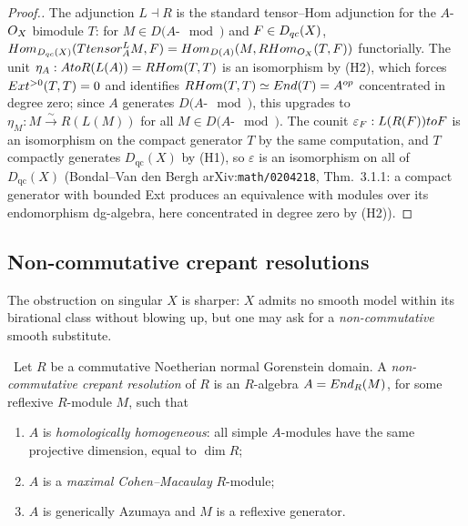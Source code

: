 \begin{proof}[Proof.]
The adjunction $L \dashv R$ is the standard tensor--Hom adjunction for the
$A$-$O_X$ bimodule $T$: for $M \in D(A\text{-}\mod)$ and $F \in D_{qc}(X)$,
$Hom_{D_{qc}(X)}(T tensor^L_A M, F) = Hom_{D(A)}(M, RHom_{O_X}(T, F))$
functorially. The unit $\eta_A : A to R(L(A)) = RHom(T, T)$ is an
isomorphism by (H2), which forces $Ext^{>0}(T, T) = 0$ and identifies $RHom(T,T)
\simeq End(T) = A^{op}$ concentrated in degree zero; since $A$ generates
$D(A\text{-}\mod)$, this upgrades to $\eta_M \colon M \xrightarrow{\sim} R(L(M))$
for all $M \in D(A\text{-}\mod)$. The counit $\varepsilon_{F} : L(R(F)) to
F$ is an isomorphism on the compact generator $T$ by the same computation, and
$T$ compactly generates $D_{\mathrm{qc}}(X)$ by (H1), so $\varepsilon$ is an
isomorphism on all of $D_{\mathrm{qc}}(X)$ (Bondal--Van den Bergh
arXiv:\texttt{math/0204218}, Thm.~3.1.1: a compact generator with bounded Ext
produces an equivalence with modules over its endomorphism dg-algebra, here
concentrated in degree zero by (H2)).
\end{proof}

\subsection*{Non-commutative crepant resolutions}

The obstruction on singular $X$ is sharper: $X$ admits no smooth model within
its birational class without blowing up, but one may ask for a
\emph{non-commutative} smooth substitute.

\begin{definition}
\label{def:nccr}
\ClaimStatusDefinition\ Let $R$ be a commutative Noetherian normal Gorenstein
domain. A \emph{non-commutative crepant resolution} of $R$ is an $R$-algebra
$A = End_R(M)$, for some reflexive $R$-module $M$, such that
\begin{enumerate}
\item[(N1)] $A$ is \emph{homologically homogeneous}: all simple $A$-modules have
the same projective dimension, equal to $\dim R$;
\item[(N2)] $A$ is a \emph{maximal Cohen--Macaulay} $R$-module;
\item[(N3)] $A$ is generically Azumaya and $M$ is a reflexive generator.
\end{enumerate}
\end{definition}

